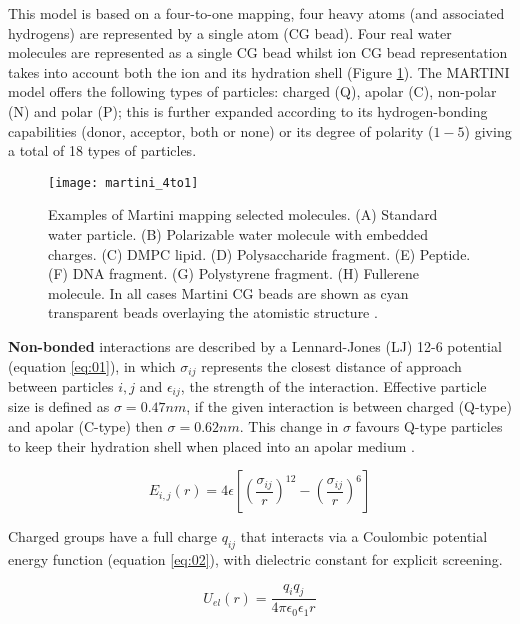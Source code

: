 \documentclass[
	12pt,				%
	openright,			%
	twoside,			%
	a4paper,			%
	english,			%
	french,				%
	spanish,			%
	brazil,				%
	]{abntex2}
\begin{document}
This model is based on a four-to-one mapping, four heavy atoms (and associated hydrogens) are represented by a single atom (CG bead). Four real water molecules are represented as a single CG bead whilst ion CG bead representation takes into account both the ion and its hydration shell \cite{Marrink2013} (Figure \ref{fig:martini4to1}). The MARTINI model offers the following types of particles: charged (Q), apolar (C), non-polar (N) and polar (P); this is further expanded according to its hydrogen-bonding capabilities (donor, acceptor, both or none) or its degree of polarity ($1-5$) giving a total of 18 types of particles.

\begin{figure}
	\centering
	\texttt{[image: martini\_4to1]}
	\caption{Examples of Martini mapping selected molecules. (A) Standard water particle. (B) Polarizable water molecule with embedded charges. (C) DMPC lipid. (D) Polysaccharide fragment. (E) Peptide. (F) DNA fragment. (G) Polystyrene fragment. (H) Fullerene molecule. In all cases Martini CG beads are shown as cyan transparent beads overlaying the atomistic structure \cite{Marrink2013}.}
	\label{fig:martini4to1}
\end{figure}

\textbf{Non-bonded} interactions are described by a Lennard-Jones (LJ) 12-6 potential (equation \ref{eq:01}), in which $\sigma_{ij}$ represents the closest distance of approach between particles $i, j$ and $\epsilon_{ij}$, the strength of the interaction. Effective particle size is defined as $\sigma=0.47nm$, if the given interaction is between charged (Q-type) and apolar (C-type) then $\sigma = 0.62nm$. This change in $\sigma$ favours Q-type particles to keep their hydration shell when placed into an apolar medium \cite{Marrink2007}.

\begin{equation}
E_{i,j}(r) = 4\epsilon \left [\left ( \frac{\sigma_{ij} }{r} \right )^{12} - \left ( \frac{\sigma_{ij} }{r} \right )^{6} \right ]
\label{eq:01}
\end{equation}

Charged groups have a full charge $q_{ij}$ that interacts via a Coulombic potential energy function (equation \ref{eq:02}), with dielectric constant for explicit screening.

\begin{equation}
U_{el}(r) = \frac{q_{i} q_{j}}{4\pi \epsilon_{0} \epsilon_{1} r}
\label{eq:02}
\end{equation}
\end{document}
